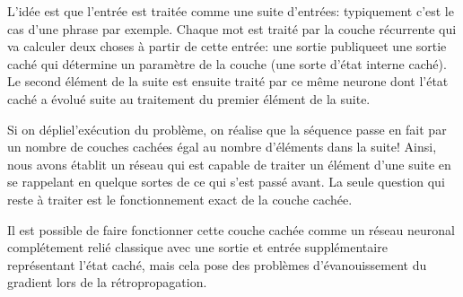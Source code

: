 \documentclass[a4paper, 11pt, onecolumn]{article}
\begin{document}
L'idée est que l'entrée est traitée comme une suite d'entrées:
typiquement c'est le cas d'une phrase par exemple. Chaque mot est traité par la
couche récurrente qui va calculer deux choses à partir de cette entrée: une
sortie \og publique\fg et une sortie caché qui détermine un paramètre de la
couche (une sorte d'état interne caché). Le second élément de la suite est
ensuite traité par ce même neurone dont l'état caché a évolué suite au
traitement du premier élément de la suite.

Si on \og déplie\fg l'exécution du problème, on réalise que la séquence passe en
fait par un nombre de couches cachées égal au nombre d'éléments dans la suite!
Ainsi, nous avons établit un réseau qui est capable de traiter un élément d'une
suite en se rappelant en quelque sortes de ce qui s'est passé avant. La seule
question qui reste à traiter est le fonctionnement exact de la couche cachée.

Il est possible de faire fonctionner cette couche cachée comme un réseau neuronal
complétement relié classique avec une sortie et entrée supplémentaire
représentant l'état caché, mais cela pose des problèmes d'évanouissement du
gradient lors de la rétropropagation.
\end{document}
